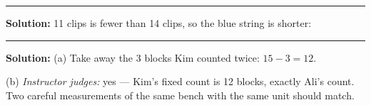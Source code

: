 \documentclass[12pt]{article}
\begin{document}
\vspace{0.2cm}\noindent\rule{\linewidth}{0.2pt}\vspace{0.1cm}


\textbf{Solution:} 11 clips is fewer than 14 clips, so the blue string is
shorter: 

\vspace{0.2cm}\noindent\rule{\linewidth}{0.2pt}\vspace{0.1cm}


\textbf{Solution:} (a) Take away the 3 blocks Kim counted twice:
$15 - 3 = 12$. 

(b) \emph{Instructor judges:} yes --- Kim's fixed count is 12 blocks, exactly
Ali's count. Two careful measurements of the same bench with the same unit
should match.
\end{document}
